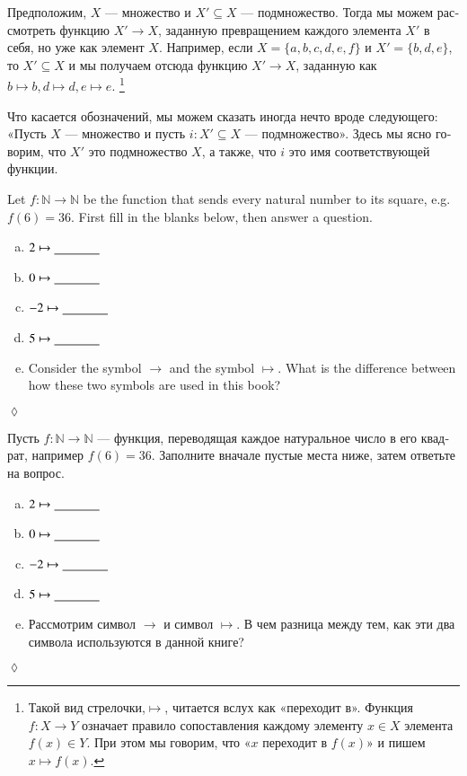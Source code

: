 \documentclass{book}
\def\NN{{\mathbb N}}
\def\to{\rightarrow}
\def\taking{\colon}
\def\ss{\subseteq}
\def\ul{\underline}
\theoremstyle{theoremENG}
\theoremstyle{lemmaENG}
\theoremstyle{propositionENG}
\theoremstyle{corollaryENG}
\theoremstyle{factENG}
\theoremstyle{remarkENG}
\theoremstyle{exampleENG}
\theoremstyle{warningENG}
\theoremstyle{questionENG}
\theoremstyle{guessENG}
\theoremstyle{answerENG}
\theoremstyle{constructionENG}
\theoremstyle{rulesENG}
\theoremstyle{excENG}
\newtheorem{excENG}[subsubsection]{\begin{english}Exercise\end{english}}
\theoremstyle{appENG}
\theoremstyle{definitionENG}
\theoremstyle{notationENG}
\theoremstyle{conjectureENG}
\theoremstyle{postulateENG}
\newenvironment{exerciseENG}{\begin{excENG}}{\hspace*{\fill}$\lozenge$\end{excENG}}
\theoremstyle{theoremRUS}
\theoremstyle{lemmaRUS}
\theoremstyle{propositionRUS}
\theoremstyle{corollaryRUS}
\theoremstyle{factRUS}
\theoremstyle{remarkRUS}
\theoremstyle{exampleRUS}
\newtheorem{exampleRUS}[subsubsection]{\begin{russian}Пример\end{russian}}
\theoremstyle{warningRUS}
\theoremstyle{questionRUS}
\theoremstyle{guessRUS}
\theoremstyle{answerRUS}
\theoremstyle{constructionRUS}
\theoremstyle{rulesRUS}
\theoremstyle{excRUS}
\newtheorem{excRUS}[subsubsection]{\begin{russian}Упражнение\end{russian}}
\theoremstyle{appRUS}
\theoremstyle{definitionRUS}
\theoremstyle{notationRUS}
\theoremstyle{conjectureRUS}
\theoremstyle{postulateRUS}
\newenvironment{exerciseRUS}{\begin{excRUS}}{\hspace*{\fill}$\lozenge$\end{excRUS}}
\def\sexc{\begin{enumerate}[a.)]\setlength{\itemsep}{.1cm}\setlength{\parskip}{.1cm}\item}
\def\next{\item}
\def\endsexc{\end{enumerate}}
\begin{document}
\begin{english}
\begin{exampleRUS}\label{ex:subset as function}
\begin{russian}
Предположим, $X$ — множество и $X'\ss X$ — подмножество. Тогда мы можем рассмотреть функцию $X'\to X$, заданную превращением каждого элемента $X'$ в себя, но уже как элемент $X$. Например, если $X=\{a,b,c,d,e,f\}$ и $X'=\{b,d,e\}$, то $X'\ss X$ и мы получаем отсюда функцию $X'\to X$, заданную как $b\mapsto b, d\mapsto d, e\mapsto e$.
\footnote{Такой вид стрелочки,\;\;$\mapsto$\;\;, читается вслух как «переходит в». Функция $f\taking X\to Y$ означает правило сопоставления каждому элементу $x\in X$ элемента $f(x)\in Y$. При этом мы говорим, что «$x$ переходит в $f(x)$» и пишем $x\mapsto f(x)$.}

Что касается обозначений, мы можем сказать иногда нечто вроде следующего: «Пусть $X$ — множество и пусть $i\taking X'\ss X$ — подмножество». Здесь мы ясно говорим, что $X'$ это подмножество $X$, а также, что $i$ это имя соответствующей функции. 
\end{russian}
\end{exampleRUS}

\begin{exerciseENG}
Let $f\taking\NN\to\NN$ be the function that sends every natural number to its square, e.g. $f(6)=36$. First fill in the blanks below, then answer a question.
\sexc $2\mapsto\ul{\hspace{.5in}}$
\next $0\mapsto\ul{\hspace{.5in}}$
\next $-2\mapsto\ul{\hspace{.5in}}$
\next $5\mapsto\ul{\hspace{.5in}}$
\next Consider the symbol $\to$ and the symbol $\mapsto$. What is the difference between how these two symbols are used in this book?
\endsexc
\end{exerciseENG}

\begin{exerciseRUS}
\begin{russian}
Пусть $f\taking\NN\to\NN$ — функция, переводящая каждое натуральное число в его квадрат, например $f(6)=36$. Заполните вначале пустые места ниже, затем ответьте на вопрос.
\sexc $2\mapsto\ul{\hspace{.5in}}$
\next $0\mapsto\ul{\hspace{.5in}}$
\next $-2\mapsto\ul{\hspace{.5in}}$
\next $5\mapsto\ul{\hspace{.5in}}$
\next Рассмотрим символ $\to$ и символ $\mapsto$. В чем разница между тем, как эти два символа используются в данной книге?
\endsexc
\end{russian}
\end{exerciseRUS}


\end{english}
\end{document}
